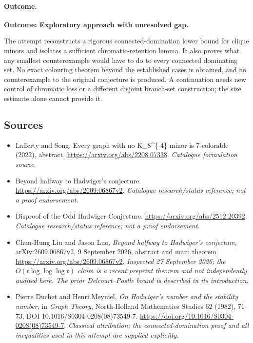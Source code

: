 \documentclass[11pt,a4paper]{article}
\numberwithin{equation}{section}
\begin{document}
\paragraph{Outcome.}
\textbf{Outcome: Exploratory approach with unresolved gap.}

The attempt reconstructs a rigorous connected-domination lower bound for
clique minors and isolates a sufficient chromatic-retention lemma. It also
proves what any smallest counterexample would have to do to every connected
dominating set. No exact colouring theorem beyond the established cases
is obtained, and no counterexample to the original conjecture is produced.
A continuation needs new control of chromatic loss or a different disjoint
branch-set construction; the size estimate alone cannot provide it.
\subsection{Sources}
\begin{itemize}\raggedright
\item[\textnormal{[S1]}]\hypertarget{source:statement:1}{} Lafferty and Song, Every graph with no K\_8\textasciicircum{}\{-4\} minor is 7-colorable (2022), abstract.
\url{https://arxiv.org/abs/2208.07338}.
{\small\textit{Catalogue formulation source.}}
\item[\textnormal{[S2]}]\hypertarget{source:statement:2}{} Beyond halfway to Hadwiger's conjecture.
\url{https://arxiv.org/abs/2609.06867v2}.
{\small\textit{Catalogue research/status reference; not a proof endorsement.}}
\item[\textnormal{[S3]}]\hypertarget{source:statement:3}{} Disproof of the Odd Hadwiger Conjecture.
\url{https://arxiv.org/abs/2512.20392}.
{\small\textit{Catalogue research/status reference; not a proof endorsement.}}
\item[\textnormal{[E1]}]\hypertarget{extra:statement:1}{} Chun-Hung Liu and
Jason Luo, \emph{Beyond halfway to Hadwiger's conjecture},
arXiv:2609.06867v2, 9 September 2026, abstract and main theorem.
\url{https://arxiv.org/abs/2609.06867v2}.
{\small\textit{Inspected 27 September 2026; the $O(t\log\log\log t)$
claim is a recent preprint theorem and not independently audited here.
The prior Delcourt--Postle bound is described in its introduction.}}
\item[\textnormal{[E2]}]\hypertarget{extra:statement:2}{} Pierre Duchet and
Henri Meyniel, \emph{On Hadwiger's number and the stability number},
in \emph{Graph Theory}, North-Holland Mathematics Studies 62 (1982),
71--73, DOI 10.1016/S0304-0208(08)73549-7.
\url{https://doi.org/10.1016/S0304-0208(08)73549-7}.
{\small\textit{Classical attribution; the connected-domination proof and
all inequalities used in this attempt are supplied explicitly.}}
\end{itemize}
\end{document}
